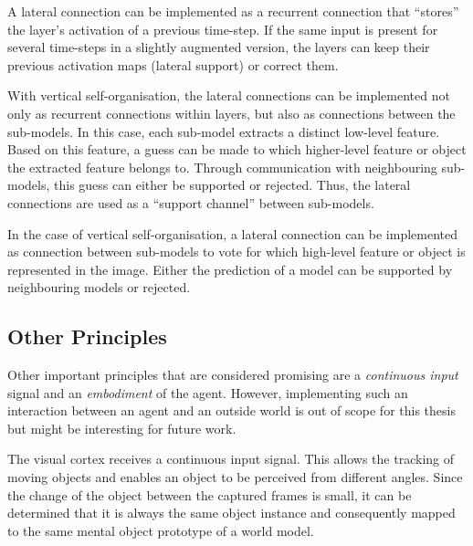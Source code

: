 \begin{implementation}
	A lateral connection can be implemented as a recurrent connection that ``stores'' the layer's activation of a previous time-step.
	If the same input is present for several time-steps in a slightly augmented version, the layers can keep their previous activation maps (lateral support) or correct them.
\end{implementation}

With vertical self-organisation, the lateral connections can be implemented not only as recurrent connections within layers, but also as connections between the sub-models.
In this case, each sub-model extracts a distinct low-level feature.
Based on this feature, a guess can be made to which higher-level feature or object the extracted feature belongs to.
Through communication with neighbouring sub-models, this guess can either be supported or rejected.
Thus, the lateral connections are used as a ``support channel'' between sub-models. 

\begin{implementation}
	In the case of vertical self-organisation, a lateral connection can be implemented as connection between sub-models to vote for which high-level feature or object is represented in the image. Either the prediction of a model can be supported by neighbouring models or rejected.
\end{implementation}


\subsection{Other Principles}
Other important principles that are considered promising are a \emph{continuous input} signal and an \emph{embodiment} of the agent.
However, implementing such an interaction between an agent and an outside world is out of scope for this thesis but might be interesting for future work.

The visual cortex receives a continuous input signal.
This allows the tracking of moving objects and enables an object to be perceived from different angles. Since the change of the object between the captured frames is small, it can be determined that it is always the same object instance and consequently mapped to the same mental object prototype of a world model.

